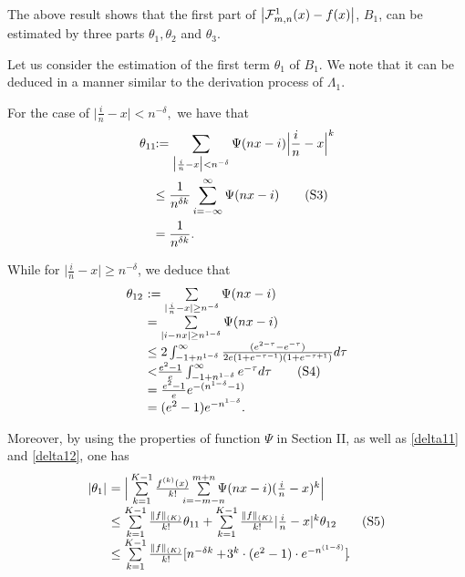 \documentclass[journal]{IEEEtran}
\begin{document}
{The above result shows that the first part of $\big|\mathcal{F}_{m,n}^{{\color{black}1}}(x)-f(x)\big|$, $B_{1}$, can 
be estimated by three parts $\theta_{1}, \theta_{2}$ and $\theta_{3}.$

Let us consider the estimation of the first term $\theta_{1}$ of $B_{1}$. We note that it can be deduced in a manner similar to the derivation process of $\Lambda_1$.

For the case of $\big|\frac{i}{n}-x\big|<{n^{-\delta}},$ we have that 
\begin{align}\label{delta11}
\theta_{11}\!\!&:=\sum\limits_{\big|\frac{i}{n}-x\big|<{n^{-\delta}}}\Psi(nx-i)\Big|\frac{i}{n}-x\Big|^{k}\notag\\
&\leq\frac{1}{n^{\delta k}}
\sum\limits_{i=-\infty}^{\infty}\Psi(nx-i)\tag{S3}\\
&=\frac{1}{n^{\delta k}}.\notag
\end{align}


While for $\big|\frac{i}{n}-x\big|\geq{n^{-\delta}}$, we deduce that 
\begin{equation}\label{delta12}
\begin{array}{ll}
\theta_{12}\!\!\!\!&:=\sum\limits_{|\frac{i}{n}-x|\geq {n^{-\delta}}}\Psi(nx-i)\\
&=\sum\limits_{|{i}-nx|\geq {{n^{1-\delta}}}}\Psi(nx-i)\\
&\leq 2\int_{-1+n^{1-\delta}}^{\infty}\frac{(e^{2-\tau}-e^{-\tau})}{2e(1+e^{-\tau-1})(1+e^{-\tau+1})}d\tau\\
&{\color{black}<}\frac{e^{2}-1}{e}\int_{-1+n^{1-\delta}}^{\infty}e^{-\tau}d\tau\tag{S4} \\ &=\frac{e^{2}-1}{e}e^{-(n^{1-\delta}-1)}\\
&=(e^{2}-1)e^{-n^{1-\delta}}.\\
\end{array}
\end{equation}


	
Moreover, by using the properties of function $\Psi$ in Section II, 
as well as \eqref{delta11} and \eqref{delta12}, one has 
\begin{equation}\label{delta1}
\begin{array}{ll}
|\theta_{1}|\!\!\!\!
&=\Big|\sum\limits_{k=1}^{K-1}\frac{f^{(k)}(x)}{k!}\sum\limits_{\mathclap{i=-m-n}}^{m+n}\Psi(nx-i)
(\frac{i}{n}-x)^{k}\Big|\\
&\leq\sum\limits_{k=1}^{K-1}\frac{\|f\|_{(K)}}{k!}
\theta_{11}+\sum\limits_{k=1}^{K-1}\frac{\|f\|_{(K)}}{k!}
|\frac{i}{n}-x|^{k}\theta_{12}\tag{S5}\\
&\leq \sum\limits_{k=1}^{K-1}\frac{\|f\|_{(K)}}{k!}[{n^{-\delta k}}
+\!3^{k}\cdot {(e^{2}-1)}\cdot e^{-n^{(1-\delta)}}]\!.\\
\end{array}
\end{equation}

}
\end{document}
